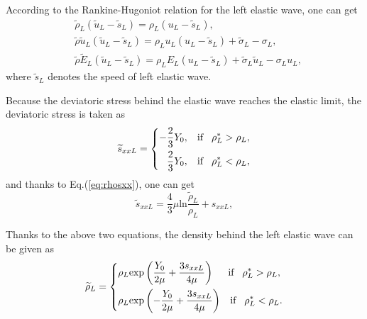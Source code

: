 \documentclass[review]{elsarticle}
\begin{document}
 According to the Rankine-Hugoniot relation for the left  elastic wave, one can  get
  \begin{align}
    &\widetilde{\rho}_L(\widetilde{u}_L-\widetilde{s}_L) = \rho_L(u_L-\widetilde{s}_L), \label{eq:RHp1}\\
    &\widetilde{\rho}\widetilde{u}_L(\widetilde{u}_L-\widetilde{s}_L) = \rho_Lu_L(u_L-\widetilde{s}_L)+\widetilde{\sigma}_L-\sigma_L,  \label{eq:RHp2}\\
    &\widetilde{\rho}\widetilde{E}_L(\widetilde{u}_L-\widetilde{s}_L) = \rho_LE_L(u_L-\widetilde{s}_L)+\widetilde{\sigma}_L \widetilde{u}_L-\sigma_Lu_L, \label{eq:RHp3}
\end{align}
where $\widetilde{s}_L$ denotes the speed of left elastic wave.

Because the deviatoric stress behind the elastic wave reaches the elastic limit, the deviatoric stress is taken as
\begin{equation}
  \widetilde{s}_{xxL} =\left\{ \begin{aligned}
      -\frac{2}{3}Y_0, \hspace{0.3cm} \text{if} \hspace{0.3cm} \rho_L^* > \rho_L,\\
      \frac{2}{3}Y_0, \hspace{0.3cm} \text{if} \hspace{0.3cm} \rho_L^* < \rho_L,\\
    \end{aligned}\right.
  \end{equation}
  and thanks to Eq.(\ref{eq:rhosxx}), one can get
  \begin{equation}
	\widetilde{s}_{xxL} = \frac{4}{3}\mu \text{ln} \frac{\widetilde {\rho}_L}{\rho_L} +s_{xxL},
  \end{equation}

Thanks to the above two equations, the density behind the left elastic wave can be given as
\begin{equation}   \widetilde{\rho}_{L} = \left\{ \begin{aligned}
      & \rho_L \text{exp}\left(\frac{Y_0}{2\mu}+\frac{3 s_{xxL}}{4\mu}\right)  \hspace{0.5cm} \text{if} \hspace{0.3cm} \rho_L^* > \rho_L,\\
& \rho_L \text{exp}\left(-\frac{Y_0}{2\mu}+\frac{3 s_{xxL}}{4\mu}\right)
\hspace{0.3cm} \text{if} \hspace{0.3cm} \rho_L^* < \rho_L.\\
  \end{aligned}\right.
 \end{equation}
\end{document}
